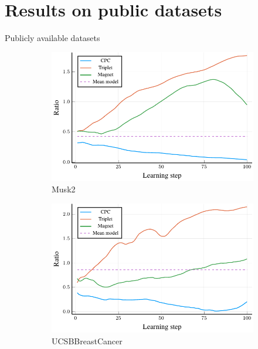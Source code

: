 \documentclass[10pt]{beamer}
\begin{document}
\section{Results on public datasets}

\begin{frame}{Publicly available datasets}
	\begin{figure}
		\centering
		\begin{subfigure}[t]{0.38\textwidth}
			\centering
			\includegraphics[width=\textwidth]{images/Musk2_ratio/Musk2_ratio.pdf}
			\caption{Musk2}
		\end{subfigure}
		\begin{subfigure}[t]{0.38\textwidth}
			\centering
			\includegraphics[width=\textwidth]{images/UCSBBreastCancer_ratio/UCSBBreastCancer_ratio.pdf}
			\caption{UCSBBreastCancer}
		\end{subfigure}
		\begin{subfigure}[t]{0.38\textwidth}

\end{subfigure}
\end{figure}
\end{frame}
\end{document}

